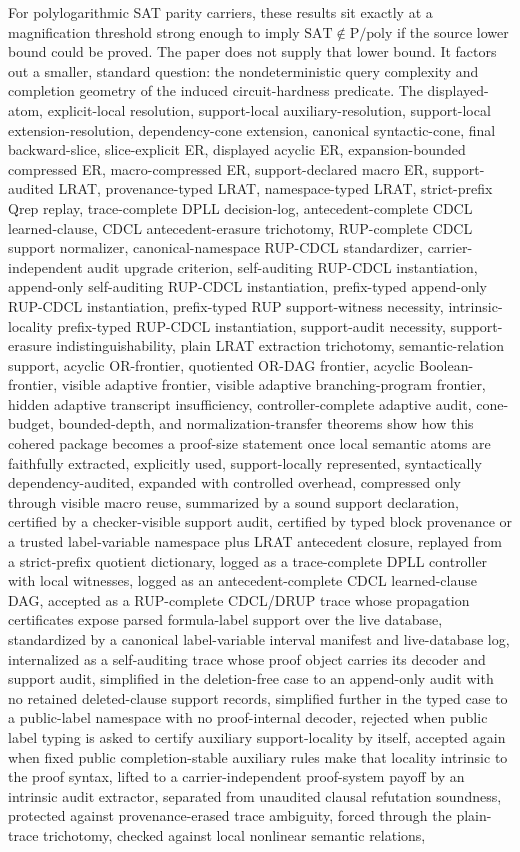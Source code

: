 \documentclass[11pt]{article}
\theoremstyle{definition}
\newcommand{\SAT}{\mathrm{SAT}}
\newcommand{\Ppoly}{\mathrm{P/poly}}
\begin{document}
For polylogarithmic SAT parity carriers, these results sit exactly at a magnification threshold strong enough to imply $\SAT\notin\Ppoly$ if the source lower bound could be proved.  The paper does not supply that lower bound.  It factors out a smaller, standard question: the nondeterministic query complexity and completion geometry of the induced circuit-hardness predicate.  The displayed-atom, explicit-local resolution, support-local auxiliary-resolution, support-local extension-resolution, dependency-cone extension, canonical syntactic-cone, final backward-slice, slice-explicit ER, displayed acyclic ER, expansion-bounded compressed ER, macro-compressed ER, support-declared macro ER, support-audited LRAT, provenance-typed LRAT, namespace-typed LRAT, strict-prefix Qrep replay, trace-complete DPLL decision-log, antecedent-complete CDCL learned-clause, CDCL antecedent-erasure trichotomy, RUP-complete CDCL support normalizer, canonical-namespace RUP-CDCL standardizer, carrier-independent audit upgrade criterion, self-auditing RUP-CDCL instantiation, append-only self-auditing RUP-CDCL instantiation, prefix-typed append-only RUP-CDCL instantiation, prefix-typed RUP support-witness necessity, intrinsic-locality prefix-typed RUP-CDCL instantiation, support-audit necessity, support-erasure indistinguishability, plain LRAT extraction trichotomy, semantic-relation support, acyclic OR-frontier, quotiented OR-DAG frontier, acyclic Boolean-frontier, visible adaptive frontier, visible adaptive branching-program frontier, hidden adaptive transcript insufficiency, controller-complete adaptive audit, cone-budget, bounded-depth, and normalization-transfer theorems show how this cohered package becomes a proof-size statement once local semantic atoms are faithfully extracted, explicitly used, support-locally represented, syntactically dependency-audited, expanded with controlled overhead, compressed only through visible macro reuse, summarized by a sound support declaration, certified by a checker-visible support audit, certified by typed block provenance or a trusted label-variable namespace plus LRAT antecedent closure, replayed from a strict-prefix quotient dictionary, logged as a trace-complete DPLL controller with local witnesses, logged as an antecedent-complete CDCL learned-clause DAG, accepted as a RUP-complete CDCL/DRUP trace whose propagation certificates expose parsed formula-label support over the live database, standardized by a canonical label-variable interval manifest and live-database log, internalized as a self-auditing trace whose proof object carries its decoder and support audit, simplified in the deletion-free case to an append-only audit with no retained deleted-clause support records, simplified further in the typed case to a public-label namespace with no proof-internal decoder, rejected when public label typing is asked to certify auxiliary support-locality by itself, accepted again when fixed public completion-stable auxiliary rules make that locality intrinsic to the proof syntax, lifted to a carrier-independent proof-system payoff by an intrinsic audit extractor, separated from unaudited clausal refutation soundness, protected against provenance-erased trace ambiguity, forced through the plain-trace trichotomy, checked against local nonlinear semantic relations, 
\end{document}
